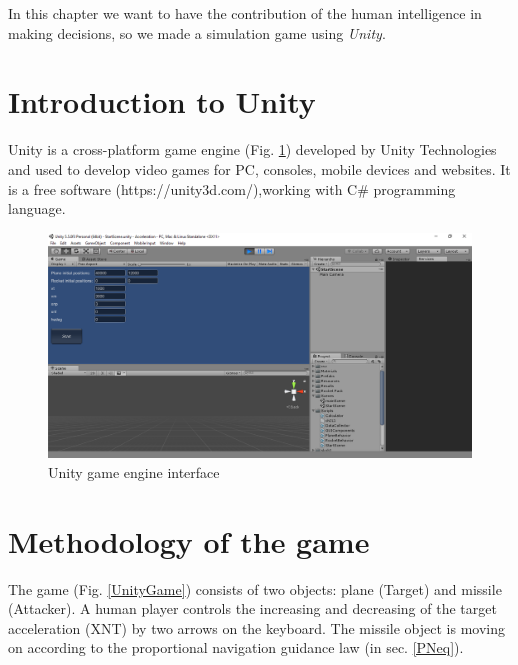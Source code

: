 \label{game}

In this chapter we want to have the contribution of the human intelligence in making decisions, so we made a simulation game using \textit{Unity}.


\section{Introduction to Unity}

Unity is a cross-platform game engine (Fig. \ref{UnityInterface}) developed by Unity Technologies and used to develop video games for PC, consoles, mobile devices and websites. It is a free software (https://unity3d.com/),working with C\# programming language. 
 

\begin{figure}[H]
	\centering
	\includegraphics[scale = 0.35]{fig/unityInterface.PNG}
	\caption{Unity game engine interface }
	\label{UnityInterface}
\end{figure}


\section{Methodology of the game}

The game (Fig. \ref{UnityGame}) consists of two objects: plane (Target) and missile (Attacker). A human player controls the increasing and decreasing of the target acceleration (XNT) by two arrows on the keyboard. The missile object is moving on according to the proportional navigation guidance law (in sec. \ref{PNeq}).
 
